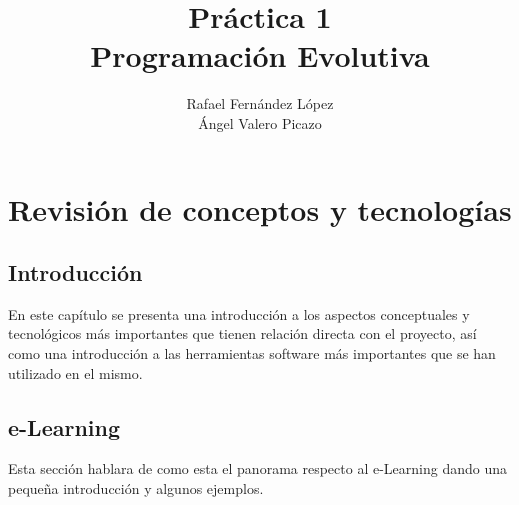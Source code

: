 \documentclass[12pt]{article}
\title{Práctica 1\\Programación Evolutiva}
\author{Rafael Fernández López\\Ángel Valero Picazo}
\date{}
\begin{document}
\maketitle
\newpage
\newpage
\tableofcontents
\newpage

\section{Revisión de conceptos y tecnologías}
\subsection{Introducción}
En este capítulo se presenta una introducción a los aspectos conceptuales y tecnológicos 
más importantes que tienen relación directa con el proyecto, así como una introducción a las 
herramientas  software  más  importantes  que  se  han  utilizado  en  el  mismo.
\newpage
\subsection{e-Learning}
	Esta sección hablara de como esta el panorama respecto al e-Learning dando una pequeña introducción y algunos ejemplos.
\newpage
\end{document}
